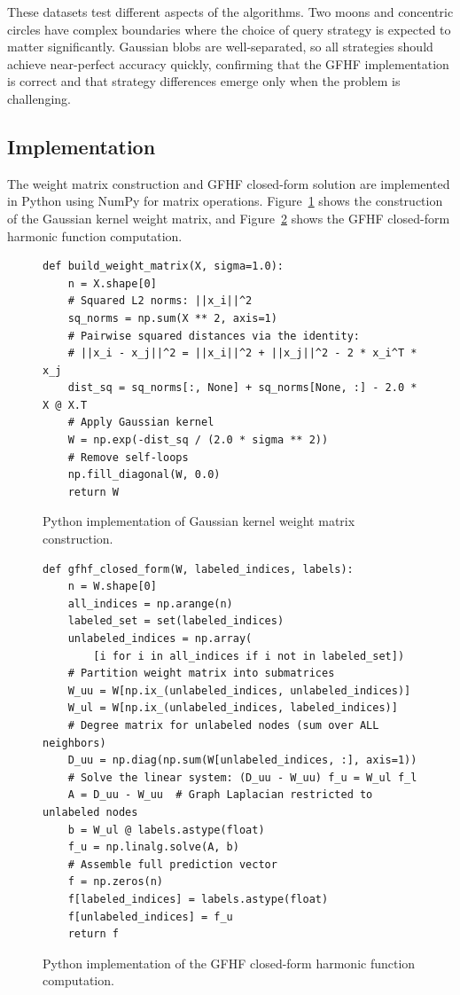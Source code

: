 \documentclass{article}
\begin{document}
These datasets test different aspects of the algorithms. Two moons and concentric circles have complex boundaries where the choice of query strategy is expected to matter significantly. Gaussian blobs are well-separated, so all strategies should achieve near-perfect accuracy quickly, confirming that the GFHF implementation is correct and that strategy differences emerge only when the problem is challenging.

\subsection{Implementation}

The weight matrix construction and GFHF closed-form solution are implemented in Python using NumPy for matrix operations. Figure~\ref{lst:weight_matrix} shows the construction of the Gaussian kernel weight matrix, and Figure~\ref{lst:gfhf} shows the GFHF closed-form harmonic function computation.

\begin{figure}[H]
{\small
\begin{verbatim}
def build_weight_matrix(X, sigma=1.0):
    n = X.shape[0]
    # Squared L2 norms: ||x_i||^2
    sq_norms = np.sum(X ** 2, axis=1)
    # Pairwise squared distances via the identity:
    # ||x_i - x_j||^2 = ||x_i||^2 + ||x_j||^2 - 2 * x_i^T * x_j
    dist_sq = sq_norms[:, None] + sq_norms[None, :] - 2.0 * X @ X.T
    # Apply Gaussian kernel
    W = np.exp(-dist_sq / (2.0 * sigma ** 2))
    # Remove self-loops
    np.fill_diagonal(W, 0.0)
    return W
\end{verbatim}
}
\caption{Python implementation of Gaussian kernel weight matrix construction.}
\label{lst:weight_matrix}
\end{figure}

\begin{figure}[H]
{\small
\begin{verbatim}
def gfhf_closed_form(W, labeled_indices, labels):
    n = W.shape[0]
    all_indices = np.arange(n)
    labeled_set = set(labeled_indices)
    unlabeled_indices = np.array(
        [i for i in all_indices if i not in labeled_set])
    # Partition weight matrix into submatrices
    W_uu = W[np.ix_(unlabeled_indices, unlabeled_indices)]
    W_ul = W[np.ix_(unlabeled_indices, labeled_indices)]
    # Degree matrix for unlabeled nodes (sum over ALL neighbors)
    D_uu = np.diag(np.sum(W[unlabeled_indices, :], axis=1))
    # Solve the linear system: (D_uu - W_uu) f_u = W_ul f_l
    A = D_uu - W_uu  # Graph Laplacian restricted to unlabeled nodes
    b = W_ul @ labels.astype(float)
    f_u = np.linalg.solve(A, b)
    # Assemble full prediction vector
    f = np.zeros(n)
    f[labeled_indices] = labels.astype(float)
    f[unlabeled_indices] = f_u
    return f
\end{verbatim}
}
\caption{Python implementation of the GFHF closed-form harmonic function computation.}
\label{lst:gfhf}
\end{figure}
\end{document}
